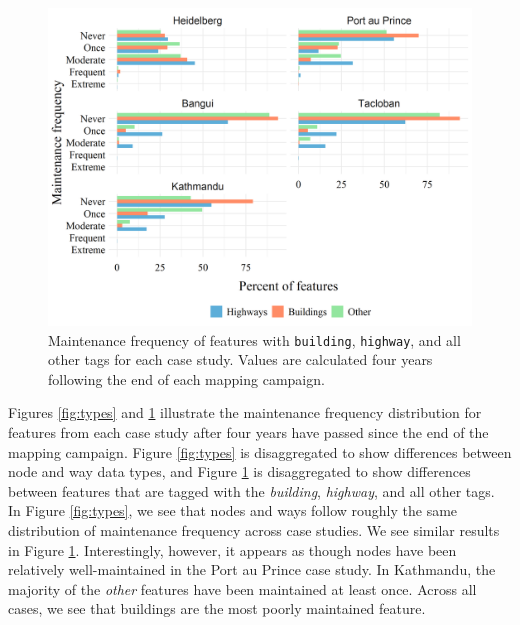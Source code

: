 \begin{figure} %
    \centering %
    \includegraphics[width = \textwidth]{Images/featmaint.png} %
    \caption[Maintenance frequency of features with \texttt{building}, \texttt{highway}, and all other tags for each case study.]{Maintenance frequency of features with \texttt{building}, \texttt{highway}, and all other tags for each case study. Values are calculated four years following the end of each mapping campaign.} %
    \label{fig:feats} %
\end{figure}

Figures \ref{fig:types} and \ref{fig:feats} illustrate the maintenance frequency distribution for features from each case study after four years have passed since the end of the mapping campaign. Figure \ref{fig:types} is disaggregated to show differences between node and way data types, and Figure \ref{fig:feats} is disaggregated to show differences between features that are tagged with the \textit{building}, \textit{highway}, and all other tags. In Figure \ref{fig:types}, we see that nodes and ways follow roughly the same distribution of maintenance frequency across case studies. We see similar results in Figure \ref{fig:feats}. Interestingly, however, it appears as though nodes have been relatively well-maintained in the Port au Prince case study. In Kathmandu, the majority of the \textit{other} features have been maintained at least once. Across all cases, we see that buildings are the most poorly maintained feature. 

